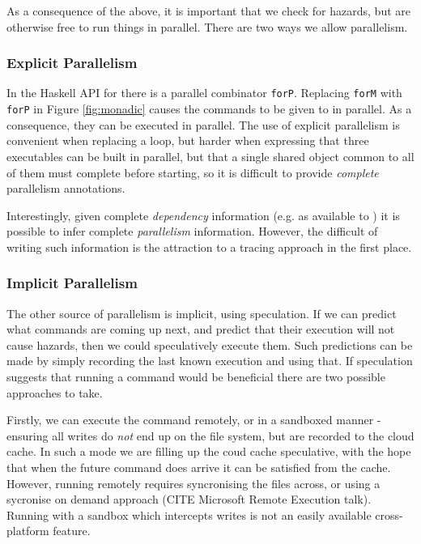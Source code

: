 As a consequence of the above, it is important that we check for hazards, but are otherwise free to run things in parallel. There are two ways we allow parallelism.

\subsubsection{Explicit Parallelism}

In the Haskell API for \Rattle there is a parallel combinator \texttt{forP}. Replacing \texttt{forM} with \texttt{forP} in Figure \ref{fig:monadic} causes the commands to be given to \Rattle in parallel. As a consequence, they can be executed in parallel. The use of explicit parallelism is convenient when replacing a loop, but harder when expressing that three executables can be built in parallel, but that a single shared object common to all of them must complete before starting, so it is difficult to provide \emph{complete} parallelism annotations.

Interestingly, given complete \emph{dependency} information (e.g. as available to \Make) it is possible to infer complete \emph{parallelism} information. However, the difficult of writing such information is the attraction to a tracing approach in the first place.

\subsubsection{Implicit Parallelism}

The other source of parallelism is implicit, using speculation. If we can predict what commands are coming up next, and predict that their execution will not cause hazards, then we could speculatively execute them. Such predictions can be made by simply recording the last known execution and using that. If speculation suggests that running a command would be beneficial there are two possible approaches to take.

Firstly, we can execute the command remotely, or in a sandboxed manner - ensuring all writes do \emph{not} end up on the file system, but are recorded to the cloud cache. In such a mode we are filling up the coud cache speculative, with the hope that when the future command does arrive it can be satisfied from the cache. However, running remotely requires syncronising the files across, or using a sycronise on demand approach (CITE Microsoft Remote Execution talk). Running with a sandbox which intercepts writes is not an easily available cross-platform feature.

